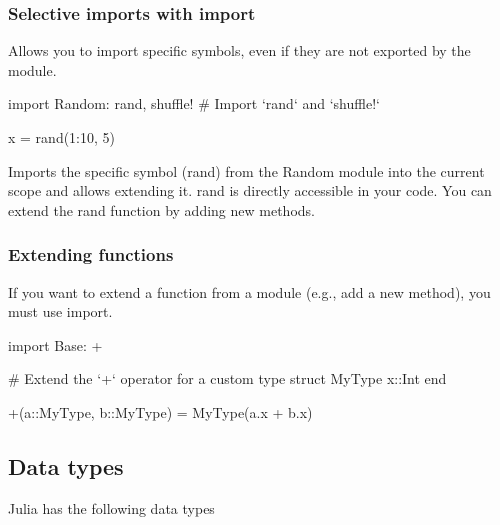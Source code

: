 \documentclass{report}
\begin{document}
    \bigbreak \noindent 
    \subsubsection{Selective imports with import}
    \bigbreak \noindent 
    Allows you to import specific symbols, even if they are not exported by the module.
    \bigbreak \noindent 
    \begin{jlcode}
    import Random: rand, shuffle!  # Import `rand` and `shuffle!`

    x = rand(1:10, 5)
    \end{jlcode}
    \bigbreak \noindent 
    Imports the specific symbol (rand) from the Random module into the current scope and allows extending it.
    \bigbreak \noindent 
    rand is directly accessible in your code.
    \bigbreak \noindent 
    You can extend the rand function by adding new methods.


    \bigbreak \noindent 
    \subsubsection{Extending functions}
    \bigbreak \noindent 
    If you want to extend a function from a module (e.g., add a new method), you must use import.
    \bigbreak \noindent 
    \begin{jlcode}
        import Base: +

        # Extend the `+` operator for a custom type
        struct MyType
        x::Int
        end

        +(a::MyType, b::MyType) = MyType(a.x + b.x)
    \end{jlcode}









    \pagebreak 
    \bigbreak \noindent 
    \subsection{Data types}
    \bigbreak \noindent 
    Julia has the following data types
    \bigbreak \noindent 
\end{document}
